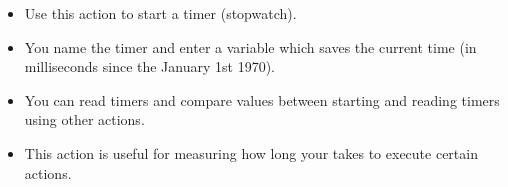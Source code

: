 
\begin{itemize}
\item Use this action to start a timer (stopwatch).
\item You name the timer and enter a variable which saves the current time (in milliseconds since the January 1st 1970). 
\item You can read timers and compare values between starting and reading timers using other actions. 
\item This action is useful for measuring how long your \gdaut{} takes to execute certain actions. 
\end{itemize}
